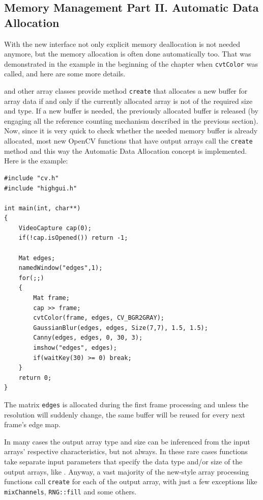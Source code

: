\subsection{Memory Management Part II. Automatic Data Allocation}\label{AutomaticMemoryManagement}

With the new interface not only explicit memory deallocation is not needed anymore,
but the memory allocation is often done automatically too. That was demonstrated in the example
in the beginning of the chapter when \texttt{cvtColor} was called, and here are some more details.

 and other array classes provide method \texttt{create} that allocates a new buffer for array
data if and only if the currently allocated array is not of the required size and type.
If a new buffer is needed, the previously allocated buffer is released
(by engaging all the reference counting mechanism described in the previous section).
Now, since it is very quick to check whether the needed memory buffer is already allocated,
most new OpenCV functions that have output arrays call the \texttt{create} method and
this way the Automatic Data Allocation concept is implemented. Here is the example:
\begin{lstlisting}
#include "cv.h"
#include "highgui.h"

int main(int, char**)
{
    VideoCapture cap(0);
    if(!cap.isOpened()) return -1;

    Mat edges;
    namedWindow("edges",1);
    for(;;)
    {
        Mat frame;
        cap >> frame;
        cvtColor(frame, edges, CV_BGR2GRAY);
        GaussianBlur(edges, edges, Size(7,7), 1.5, 1.5);
        Canny(edges, edges, 0, 30, 3);
        imshow("edges", edges);
        if(waitKey(30) >= 0) break;
    }
    return 0;
}
\end{lstlisting}
The matrix \texttt{edges} is allocated during the first frame processing and unless the resolution will suddenly change,
the same buffer will be reused for every next frame's edge map.

In many cases the output array type and size can be inferenced from the input arrays' respective characteristics, but not always.
In these rare cases functions take separate input parameters that specify the data type and/or size of the output arrays,
like . Anyway, a vast majority of the new-style array processing functions call \texttt{create}
for each of the output array, with just a few exceptions like \texttt{mixChannels}, \texttt{RNG::fill} and some others.

